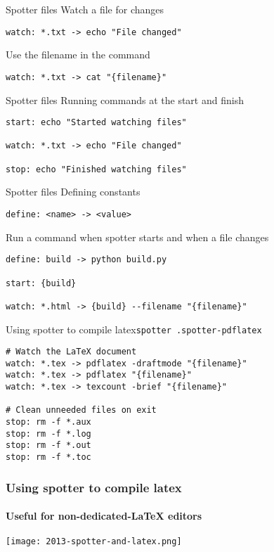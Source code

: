 \documentclass{beamer}
\begin{document}
\begin{frame}[fragile]{Spotter files}
Watch a file for changes
\begin{verbatim}
watch: *.txt -> echo "File changed"
\end{verbatim}
\pause
\vspace{1em}
Use the filename in the command
\begin{verbatim}
watch: *.txt -> cat "{filename}"
\end{verbatim}
\end{frame}

\begin{frame}[fragile]{Spotter files}
Running commands at the start and finish
\begin{verbatim}
start: echo "Started watching files"

watch: *.txt -> echo "File changed"

stop: echo "Finished watching files"
\end{verbatim}
\end{frame}

\begin{frame}[fragile]{Spotter files}
Defining constants
\begin{verbatim}
define: <name> -> <value>
\end{verbatim}
\pause
\vspace{1em}
Run a command when spotter starts and when a file changes
\begin{verbatim}
define: build -> python build.py

start: {build}

watch: *.html -> {build} --filename "{filename}"
\end{verbatim}
\end{frame}

\begin{frame}[fragile]{Using spotter to compile latex}{\texttt{spotter .spotter-pdflatex}}
\begin{verbatim}
# Watch the LaTeX document
watch: *.tex -> pdflatex -draftmode "{filename}"
watch: *.tex -> pdflatex "{filename}"
watch: *.tex -> texcount -brief "{filename}"

# Clean unneeded files on exit
stop: rm -f *.aux
stop: rm -f *.log
stop: rm -f *.out
stop: rm -f *.toc
\end{verbatim}
\end{frame}

\begin{frame}
    \frametitle{Using spotter to compile latex}
    \framesubtitle{Useful for non-dedicated-\LaTeX{} editors}
    \texttt{[image: 2013-spotter-and-latex.png]}
\end{frame}
\end{document}
